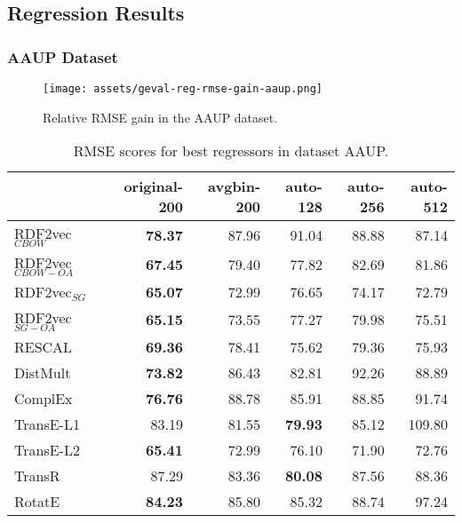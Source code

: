 \documentclass[11pt,titlepage,oneside,openany]{book}
\begin{document}
\newpage

\subsection{Regression Results}
\label{subsec:geval-results-reg-dataset}

\subsubsection{AAUP Dataset}
\label{subsubsec:geval-results-reg-aaup}


\begin{figure}[H]
    \centering
    \texttt{[image: assets/geval-reg-rmse-gain-aaup.png]}
    \vspace*{-3mm}
    \caption{Relative RMSE gain in the AAUP dataset.}
    \label{fig:geval-reg-rmse-gain-aaup}
\end{figure}


\begin{table}[H]
\centering
\begin{tabular}{lrrrrr}
\toprule
{} &  original-200 &  avgbin-200 &  auto-128 &  auto-256 &  auto-512 \\
\midrule
RDF2vec$_{CBOW}$     &	\textbf{78.37} &       87.96  &     91.04  &     88.88  &     87.14  \\
RDF2vec$_{CBOW-OA}$  &	\textbf{67.45} &       79.40  &     77.82  &     82.69  &     81.86  \\
RDF2vec$_{SG}$       &	\textbf{65.07} &       72.99  &     76.65  &     74.17  &     72.79  \\
RDF2vec$_{SG-OA}$    &	\textbf{65.15} &       73.55  &     77.27  &     79.98  &     75.51  \\
RESCAL               &	\textbf{69.36} &       78.41  &     75.62  &     79.36  &     75.93  \\
DistMult             &	\textbf{73.82} &       86.43  &     82.81  &     92.26  &     88.89  \\
ComplEx              &	\textbf{76.76} &       88.78  &     85.91  &     88.85  &     91.74  \\
TransE-L1            &         83.19  &       81.55  &	\textbf{79.93} &     85.12  &    109.80  \\
TransE-L2            &	\textbf{65.41} &       72.99  &     76.10  &     71.90  &     72.76  \\
TransR               &         87.29  &       83.36  &	\textbf{80.08} &     87.56  &     88.36  \\
RotatE               &	\textbf{84.23} &       85.80  &     85.32  &     88.74  &     97.24  \\
\bottomrule
\end{tabular}
\caption{RMSE scores for best regressors in dataset AAUP.}
\label{tab:geval-reg-rmse-aaup}
\end{table}
\end{document}

